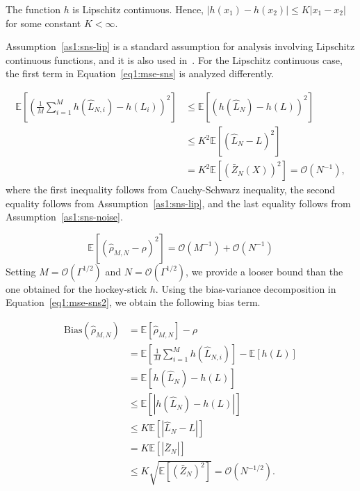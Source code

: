 \begin{assumption}\label{as1:sns-lip}
    The function $h$ is Lipschitz continuous. Hence, $|h(x_1) - h(x_2)| \leq K|x_1 - x_2|$ for some constant $K< \infty$.
\end{assumption}
Assumption~\ref{as1:sns-lip} is a standard assumption for analysis involving Lipschitz continuous functions, and it is also used in~\cite{broadie2015risk}.
For the Lipschitz continuous case, the first term in Equation~\eqref{eq1:mse-sns} is analyzed differently.

\begin{align}
    \mathbb{E} \left[  \left( \frac{1}{M} \sum_{i=1}^M h\left( \hat{L}_{N, i} \right) -  h\left(L_i \right)  \right)^2\right]    
    & \leq \mathbb{E} \left[ \left( h\left( \hat{L}_N \right) -  h\left(L \right)  \right)^2\right]  \nonumber \\
    & \leq K^2 \mathbb{E} \left[ \left( \hat{L}_N -  L  \right)^2\right] \nonumber \\
    & = K^2 \mathbb{E} \left[ \left( \bar{Z}_{N}(X) \right)^2\right] = \mathcal{O}(N^{-1}),
\end{align}
where the first inequality follows from Cauchy-Schwarz inequality, the second equality follows from Assumption~\ref{as1:sns-lip}, and the last equality follows from Assumption~\ref{as1:sns-noise}.


\begin{equation}
    \mathbb{E} \left[ \left( \hat{\rho}_{M, N} - \rho \right)^2 \right] = \mathcal{O}(M^{-1}) + \mathcal{O}(N^{-1})
\end{equation}
Setting $M = \mathcal{O}(\Gamma^{1/2})$ and $N = \mathcal{O}(\Gamma^{1/2})$, we provide a looser bound than the one obtained for the hockey-stick $h$.
Using the bias-variance decomposition in Equation~\eqref{eq1:mse-sns2}, we obtain the following bias term.

\begin{align}\label{eq1:bias-sns-lip}
    \text{Bias}(\hat{\rho}_{M, N})
    & = \mathbb{E} \left[ \hat{\rho}_{M, N} \right] - \rho \nonumber \\
    & = \mathbb{E} \left[ \frac{1}{M} \sum_{i=1}^M h\left( \hat{L}_{N, i} \right) \right] - \mathbb{E} \left[ h\left(L \right) \right]  \nonumber \\
    & = \mathbb{E} \left[ h\left( \hat{L}_N \right) - h\left( L \right) \right] \nonumber \\
    & \leq \mathbb{E} \left[ |h\left( \hat{L}_N \right) - h\left( L \right) | \right] \nonumber \\
    & \leq K \mathbb{E} \left[ |\hat{L}_N - L| \right] \nonumber \\
    & = K \mathbb{E} \left[ |\bar{Z}_N| \right] \nonumber \\
    & \leq K \sqrt{\mathbb{E} \left[ \left( \bar{Z}_N \right)^2 \right]} = \mathcal{O}(N^{-1/2}).
\end{align}

